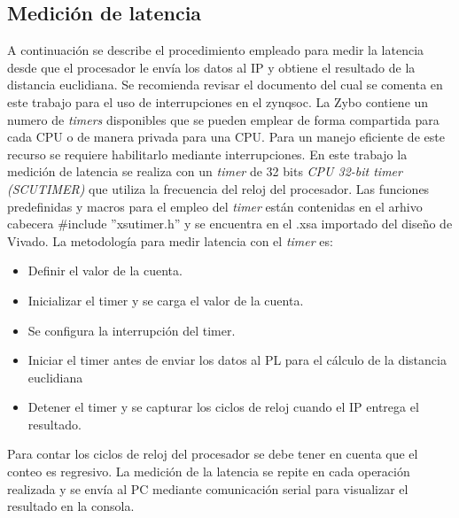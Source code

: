 \documentclass[conference]{IEEEtran}
\begin{document}
\subsection{Medición de latencia}
A continuación se describe el procedimiento empleado para medir la latencia desde que el procesador le envía los datos al IP y obtiene el resultado de la distancia euclidiana. Se recomienda revisar el documento \cite{taylor2014use} del cual se comenta en este trabajo para el uso de interrupciones en el zynqsoc. La Zybo contiene un numero de \textit{timers} disponibles  que se pueden emplear de forma compartida para cada CPU o de manera privada para una CPU. Para un manejo eficiente de este recurso se requiere  habilitarlo mediante interrupciones. En este trabajo la medición de latencia se realiza con un  \textit{timer} de 32 bits \textit{CPU 32-bit timer (SCUTIMER)} que utiliza la frecuencia del reloj del procesador. Las funciones predefinidas y macros para el empleo  del \textit{timer} están contenidas en el arhivo cabecera \#include ''xsutimer.h'' y se encuentra en el  .xsa importado del diseño de Vivado. La metodología para medir latencia con el \textit{timer} es:
\begin{itemize}
    \item Definir el valor de la cuenta.
     \item Inicializar el timer y se carga el  valor de la cuenta.
    \item Se configura la interrupción del timer.
    \item Iniciar el timer antes de enviar los datos al PL para el cálculo de la distancia euclidiana
    \item Detener el timer y se capturar los ciclos de reloj cuando el IP entrega el resultado.
\end{itemize}
Para contar los ciclos de reloj del procesador se debe tener en cuenta que el conteo es regresivo. La medición de la latencia se repite en cada operación realizada y se envía al PC mediante comunicación serial para visualizar el resultado en la consola.
\end{document}
